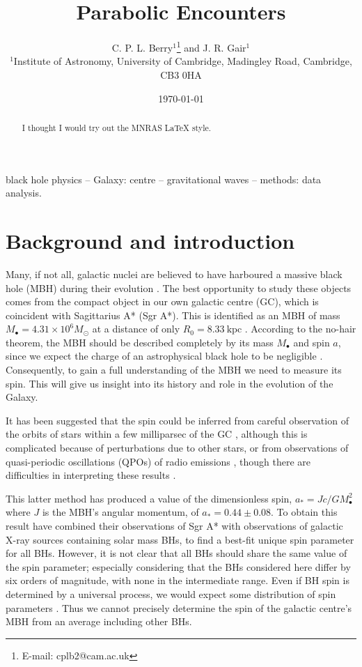 \documentclass[useAMS,usedcolumn,usegraphicx,usenatbib]{mn2e}
\title[Parabolic Encounters]{Parabolic Encounters}
\author[C. P. L. Berry and J. R. Gair]{C. P. L. Berry$^{1}$\thanks{E-mail:
cplb2@cam.ac.uk}  and J. R. Gair$^{1}$\\
$^{1}$Institute of Astronomy, University of Cambridge, Madingley Road, Cambridge, CB3 0HA}
\newcommand{\units}[1]{\ensuremath{~\mathrm{#1}}}
\begin{document}
\date{\today}

\pagerange{\pageref{firstpage}--\pageref{lastpage}} 

\maketitle

\label{firstpage}

\begin{abstract}
I thought I would try out the MNRAS \LaTeX{} style.
\end{abstract}

\begin{keywords}
black hole physics -- Galaxy: centre -- gravitational waves -- methods: data analysis.
\end{keywords}

\section{Background and introduction}

Many, if not all, galactic nuclei  are believed to have harboured a massive black hole (MBH) during their evolution \citep{Lynden-Bell1971, Rees1984}. The best opportunity to study these objects comes from the compact object in our own galactic centre (GC), which is coincident with Sagittarius A* (Sgr A*). This is identified as an MBH of mass $M_\bullet = 4.31 \times 10^6 M_\odot$ at a distance of only $R_0 = 8.33\units{kpc}$ \citep{Gillessen2009}. According to the no-hair theorem, the MBH should be described completely by its mass $M_\bullet$ and spin $a$, since we expect the charge of an astrophysical black hole to be negligible \citep{Israel1967, Israel1968, Carter1971, Hawking1972, Robinson1975, Chandrasekhar1998}. Consequently, to gain a full understanding of the MBH we need to measure its spin. This will give us insight into its history and role in the evolution of the Galaxy.

It has been suggested that the spin could be inferred from careful observation of the orbits of stars within a few milliparsec of the GC \citep{Merritt2010}, although this is complicated because of perturbations due to other stars, or from observations of quasi-periodic oscillations (QPOs) of radio emissions \citep{Kato2010}, though there are difficulties in interpreting these results \citep{Psaltis2008a}.

This latter method has produced a value of the dimensionless spin, $a_\ast = Jc/GM_\bullet^2$ where $J$ is the MBH's angular momentum, of $a_\ast = 0.44 \pm 0.08$. To obtain this result \citet{Kato2010} have combined their observations of Sgr A* with observations of galactic X-ray sources containing solar mass BHs, to find a best-fit unique spin parameter for all BHs. However, it is not clear that all BHs should share the same value of the spin parameter; especially considering that the BHs considered here differ by six orders of magnitude, with none in the intermediate range. Even if BH spin is determined by a universal process, we would expect some distribution of spin parameters \citep{King2008}. Thus we cannot precisely determine the spin of the galactic centre's MBH from an average including other BHs.
\end{document}
